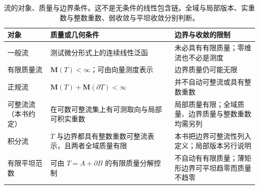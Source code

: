 \begin{table}[htbp]
\centering\small\renewcommand{\arraystretch}{1.18}\setlength{\tabcolsep}{4pt}
\caption[流的对象、质量与边界条件]{流的对象、质量与边界条件。这不是无条件的线性包含链。全域与局部版本、实重数与整数重数、弱收敛与平坦收敛分别判断。}
\label{b1:tab:visual-t18}
\begin{tabularx}{\linewidth}{@{}>{\raggedright\arraybackslash}p{3.1cm}>{\raggedright\arraybackslash}p{4.7cm}>{\raggedright\arraybackslash}X@{}}
\toprule
对象 & 质量或几何条件 & 边界与收敛的限制 \\
\midrule
一般流 & 测试微分形式上的连续线性泛函 & 未必具有有限质量；零维流也不必是测度 \\
有限质量流 & \(\mathbf M(T)<\infty\)；可由向量测度表示 & 边界质量仍可能无限 \\
正规流 & \(\mathbf M(T)+\mathbf M(\partial T)<\infty\) & 并不自动可整流或具有整数重数 \\
可整流流（本书约定） & 在可数可整流集上有可测取向与局部可积实重数 & 局部质量有限；全域质量、边界质量与整数重数均需另列 \\
积分流 & \(T\) 与边界都具有整数重数可整流表示，且两者全域质量有限 & 本书把边界可整流性列入定义；局部版本另行说明 \\
有限平坦范数 & 可由 \(T=A+\partial B\) 的有限质量分解控制 & 不自动有有限质量；薄矩形边界可平坦趋零而质量不趋零 \\
\bottomrule
\end{tabularx}
\end{table}

